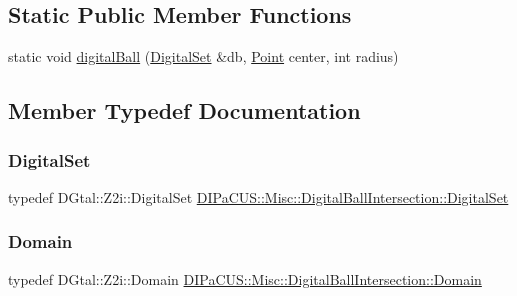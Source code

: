 \subsection*{Static Public Member Functions}
\begin{DoxyCompactItemize}
\item 
static void \mbox{\hyperlink{classDIPaCUS_1_1Misc_1_1DigitalBallIntersection_afa60d40e425368adaf396d7a1a71242f}{digital\+Ball}} (\mbox{\hyperlink{classDIPaCUS_1_1Misc_1_1DigitalBallIntersection_aaed19d165964a423d69f19a3de0d5587}{Digital\+Set}} \&db, \mbox{\hyperlink{classDIPaCUS_1_1Misc_1_1DigitalBallIntersection_a7e348073cb818df2e225d22746e1d6af}{Point}} center, int radius)
\end{DoxyCompactItemize}


\subsection{Member Typedef Documentation}
\mbox{\label{classDIPaCUS_1_1Misc_1_1DigitalBallIntersection_aaed19d165964a423d69f19a3de0d5587}} 
\subsubsection{\texorpdfstring{Digital\+Set}{DigitalSet}}
{\footnotesize\ttfamily typedef D\+Gtal\+::\+Z2i\+::\+Digital\+Set \mbox{\hyperlink{classDIPaCUS_1_1Misc_1_1DigitalBallIntersection_aaed19d165964a423d69f19a3de0d5587}{D\+I\+Pa\+C\+U\+S\+::\+Misc\+::\+Digital\+Ball\+Intersection\+::\+Digital\+Set}}}

\mbox{\label{classDIPaCUS_1_1Misc_1_1DigitalBallIntersection_a23d82ed15613f37ad616a455bcce7542}} 
\subsubsection{\texorpdfstring{Domain}{Domain}}
{\footnotesize\ttfamily typedef D\+Gtal\+::\+Z2i\+::\+Domain \mbox{\hyperlink{classDIPaCUS_1_1Misc_1_1DigitalBallIntersection_a23d82ed15613f37ad616a455bcce7542}{D\+I\+Pa\+C\+U\+S\+::\+Misc\+::\+Digital\+Ball\+Intersection\+::\+Domain}}}

